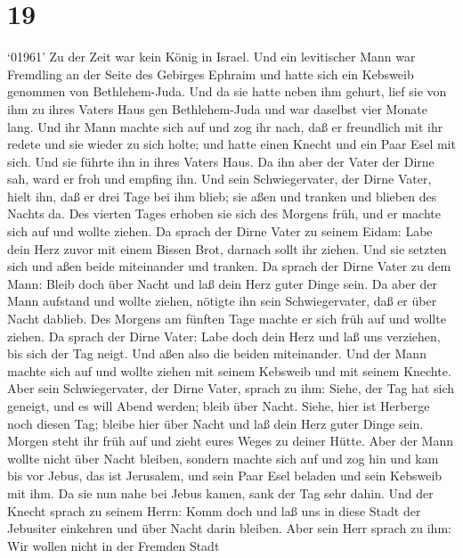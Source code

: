 \hypertarget{section-18}{%
\section{19}\label{section-18}}

 `01961' Zu der Zeit war kein König in Israel. Und ein
levitischer Mann war Fremdling an der Seite des Gebirges Ephraim und
hatte sich ein Kebsweib genommen von Bethlehem-Juda.  Und da
sie hatte neben ihm gehurt, lief sie von ihm zu ihres Vaters Haus gen
Bethlehem-Juda und war daselbst vier Monate lang.  Und ihr
Mann machte sich auf und zog ihr nach, daß er freundlich mit ihr redete
und sie wieder zu sich holte; und hatte einen Knecht und ein Paar Esel
mit sich. Und sie führte ihn in ihres Vaters Haus. Da ihn aber der Vater
der Dirne sah, ward er froh und empfing ihn.  Und sein
Schwiegervater, der Dirne Vater, hielt ihn, daß er drei Tage bei ihm
blieb; sie aßen und tranken und blieben des Nachts da.  Des
vierten Tages erhoben sie sich des Morgens früh, und er machte sich auf
und wollte ziehen. Da sprach der Dirne Vater zu seinem Eidam: Labe dein
Herz zuvor mit einem Bissen Brot, darnach sollt ihr ziehen. 
Und sie setzten sich und aßen beide miteinander und tranken. Da sprach
der Dirne Vater zu dem Mann: Bleib doch über Nacht und laß dein Herz
guter Dinge sein.  Da aber der Mann aufstand und wollte
ziehen, nötigte ihn sein Schwiegervater, daß er über Nacht dablieb.
 Des Morgens am fünften Tage machte er sich früh auf und
wollte ziehen. Da sprach der Dirne Vater: Labe doch dein Herz und laß
uns verziehen, bis sich der Tag neigt. Und aßen also die beiden
miteinander.  Und der Mann machte sich auf und wollte ziehen
mit seinem Kebsweib und mit seinem Knechte. Aber sein Schwiegervater,
der Dirne Vater, sprach zu ihm: Siehe, der Tag hat sich geneigt, und es
will Abend werden; bleib über Nacht. Siehe, hier ist Herberge noch
diesen Tag; bleibe hier über Nacht und laß dein Herz guter Dinge sein.
Morgen steht ihr früh auf und zieht eures Weges zu deiner Hütte.
 Aber der Mann wollte nicht über Nacht bleiben, sondern
machte sich auf und zog hin und kam bis vor Jebus, das ist Jerusalem,
und sein Paar Esel beladen und sein Kebsweib mit ihm.  Da
sie nun nahe bei Jebus kamen, sank der Tag sehr dahin. Und der Knecht
sprach zu seinem Herrn: Komm doch und laß uns in diese Stadt der
Jebusiter einkehren und über Nacht darin bleiben.  Aber
sein Herr sprach zu ihm: Wir wollen nicht in der Fremden Stadt
